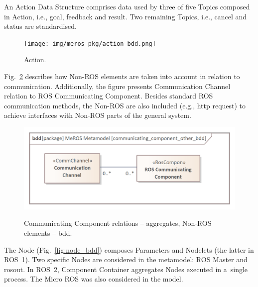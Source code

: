 \documentclass[11pt,oneside,a4paper]{report}
\begin{document}
	An Action Data Structure comprises data used by three of five Topics composed in Action, i.e., goal, feedback and result. Two remaining Topics, i.e., cancel and status are standardised.
	
	\begin{figure}[hbt]
		\centering
		\begin{center}
			{\texttt{[image: img/meros\_pkg/action\_bdd.png]}}
		\end{center}
		\caption{Action.} 
		\label{fig:action_bdd}
	\end{figure}
	
	\pagebreak
	Fig.~\ref{fig:communicating_component_other_bdd} describes how Non-ROS elements are taken into account in relation to communication. Additionally, the figure presents Communication Channel relation to ROS Communicating Component. Besides standard ROS communication methods, the Non-ROS are also included (e.g., http request) to achieve interfaces with Non-ROS parts of the general system. 
	

	\begin{figure}[H]
		\centering
		\begin{center}
			{\includegraphics[scale=1.1]{img/meros_pkg/communicating_component_other_bdd.png}}
		\end{center}
		\caption{Communicating Component relations -- aggregates, Non-ROS elements -- bdd.} 
		\label{fig:communicating_component_other_bdd}
	\end{figure}
	

	\pagebreak
		 
 	The Node (Fig.~\ref{fig:node_bdd}) composes Parameters and Nodelets (the latter in ROS~1). Two specific Nodes are considered in the metamodel: ROS Master and rosout. In ROS~2, Component Container aggregates Nodes executed in a~single process. The Micro ROS was also considered in the model. 
 	
\end{document}
